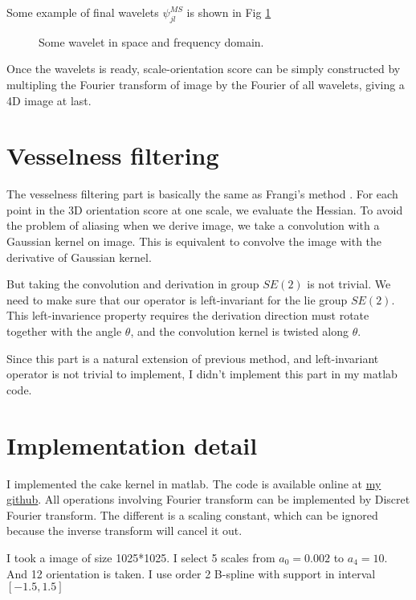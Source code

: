 \documentclass{article}
\begin{document}
	Some example of final wavelets $\psi^{MS}_{jl}$ is shown in Fig \ref{fig:wavelet}
	\begin{figure}[h]
		\centering
		\caption{Some wavelet in space and frequency domain.}
		\label{fig:wavelet}
	\end{figure}

	Once the wavelets is ready, scale-orientation score can be simply constructed by multipling the Fourier transform of image by the Fourier of all wavelets, giving a 4D image at last.

	\section{Vesselness filtering}
	The vesselness filtering part is basically the same as Frangi's method \cite{frangi1998multiscale}. For each point in the 3D orientation score at one scale, we evaluate the Hessian. To avoid the problem of aliasing when we derive image, we take a convolution with a Gaussian kernel on image. This is equivalent to convolve the image with the derivative of Gaussian kernel.
	
	But taking the convolution and derivation in group $SE(2)$ is not trivial. We need to make sure that our operator is left-invariant for the lie group $SE(2)$. This left-invarience property requires the derivation direction must rotate together with the angle $\theta$, and the convolution kernel is twisted along $\theta$. 
	
	Since this part is a natural extension of previous method, and left-invariant operator is not trivial to implement, I didn't implement this part in my matlab code.
	
	
	\section{Implementation detail}
	I implemented the cake kernel in matlab. The code is available online at \href{https://github.com/flm8620/Crossing-Preserving-Multi-scale-Vesselness}{my github}. All operations involving Fourier transform can be implemented by Discret Fourier transform. The different is a scaling constant, which can be ignored because the inverse transform will cancel it out.
	
	I took a image of size 1025*1025. I select 5 scales from $a_0=0.002$ to $a_4=10$. And 12 orientation is taken. I use order 2 B-spline with support in interval $[-1.5, 1.5]$



\end{document}
